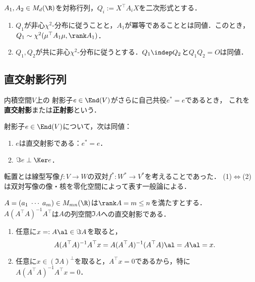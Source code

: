 \documentclass[uplatex,dvipdfmx]{jsarticle}
\begin{document}
\begin{corollary}\label{cor-Fisher-Cochran}
    $A_1,A_2\in M_d(\R)$を対称行列，$Q_i:=X^\top A_iX$を二次形式とする．
    \begin{enumerate}
        \item $Q_1$が非心$\chi^2$-分布に従うことと，$A_1$が冪等であることとは同値．このとき，$Q_1\sim\chi^2(\mu^\top A_1\mu,\rank A_1)$．
        \item $Q_1,Q_2$が共に非心$\chi^2$-分布に従うとする．$Q_1\indep Q_2$と$Q_1Q_2=O$は同値．
    \end{enumerate}
\end{corollary}

\subsection{直交射影行列}

\begin{definition}
    内積空間$V$上の
    射影子$e\in\End(V)$がさらに自己共役$e^*=e$であるとき，
    これを\textbf{直交射影}または\textbf{正射影}という．
\end{definition}


\begin{proposition}[直交射影の特徴付け]
    射影子$e\in\End(V)$について，次は同値：
    \begin{enumerate}
        \item $e$は直交射影である：$e^*=e$．
        \item $\Im e\perp \Ker e$．
    \end{enumerate}
\end{proposition}
\begin{Proof}
    転置とは線型写像$f:V\to W$の双対$f^*:W^*\to V^*$を考えることであった．
    (1)$\Leftrightarrow$(2)は双対写像の像・核を零化空間によって表す一般論による．
\end{Proof}

\begin{proposition}[直交射影行列の表示]
    $A=(a_1\;\cdots\;a_m)\in M_{mn}(\R)$は$\rank A=m\le n$を満たすとする．
    $A(A^\top A)^{-1}A^\top$は$A$の列空間$\Im A$への直交射影である．
\end{proposition}
\begin{Proof}\mbox{}
    \begin{enumerate}
        \item 任意に$x=:A\al\in\Im A$を取ると，
        \[A(A^\top A)^{-1}A^\top x=A(A^\top A)^{-1}(A^\top A)\al=A\al=x.\]
        \item 任意に$x\in(\Im A)^\perp$を取ると，$A^\top x=0$であるから，特に$A(A^\top A)^{-1}A^\top x=0$．
    \end{enumerate}
\end{Proof}
\end{document}
